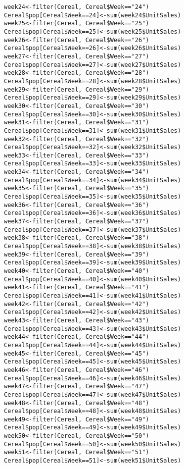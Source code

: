 \documentclass[12pt,english]{article}
\begin{document}
\begin{lstlisting}
week24<-filter(Cereal, Cereal$Week=="24")
Cereal$pop[Cereal$Week==24]<-sum(week24$UnitSales)
week25<-filter(Cereal, Cereal$Week=="25")
Cereal$pop[Cereal$Week==25]<-sum(week25$UnitSales)
week26<-filter(Cereal, Cereal$Week=="26")
Cereal$pop[Cereal$Week==26]<-sum(week26$UnitSales)
week27<-filter(Cereal, Cereal$Week=="27")
Cereal$pop[Cereal$Week==27]<-sum(week27$UnitSales)
week28<-filter(Cereal, Cereal$Week=="28")
Cereal$pop[Cereal$Week==28]<-sum(week28$UnitSales)
week29<-filter(Cereal, Cereal$Week=="29")
Cereal$pop[Cereal$Week==29]<-sum(week29$UnitSales)
week30<-filter(Cereal, Cereal$Week=="30")
Cereal$pop[Cereal$Week==30]<-sum(week30$UnitSales)
week31<-filter(Cereal, Cereal$Week=="31")
Cereal$pop[Cereal$Week==31]<-sum(week31$UnitSales)
week32<-filter(Cereal, Cereal$Week=="32")
Cereal$pop[Cereal$Week==32]<-sum(week32$UnitSales)
week33<-filter(Cereal, Cereal$Week=="33")
Cereal$pop[Cereal$Week==33]<-sum(week33$UnitSales)
week34<-filter(Cereal, Cereal$Week=="34")
Cereal$pop[Cereal$Week==34]<-sum(week34$UnitSales)
week35<-filter(Cereal, Cereal$Week=="35")
Cereal$pop[Cereal$Week==35]<-sum(week35$UnitSales)
week36<-filter(Cereal, Cereal$Week=="36")
Cereal$pop[Cereal$Week==36]<-sum(week36$UnitSales)
week37<-filter(Cereal, Cereal$Week=="37")
Cereal$pop[Cereal$Week==37]<-sum(week37$UnitSales)
week38<-filter(Cereal, Cereal$Week=="38")
Cereal$pop[Cereal$Week==38]<-sum(week38$UnitSales)
week39<-filter(Cereal, Cereal$Week=="39")
Cereal$pop[Cereal$Week==39]<-sum(week39$UnitSales)
week40<-filter(Cereal, Cereal$Week=="40")
Cereal$pop[Cereal$Week==40]<-sum(week40$UnitSales)
week41<-filter(Cereal, Cereal$Week=="41")
Cereal$pop[Cereal$Week==41]<-sum(week41$UnitSales)
week42<-filter(Cereal, Cereal$Week=="42")
Cereal$pop[Cereal$Week==42]<-sum(week42$UnitSales)
week43<-filter(Cereal, Cereal$Week=="43")
Cereal$pop[Cereal$Week==43]<-sum(week43$UnitSales)
week44<-filter(Cereal, Cereal$Week=="44")
Cereal$pop[Cereal$Week==44]<-sum(week44$UnitSales)
week45<-filter(Cereal, Cereal$Week=="45")
Cereal$pop[Cereal$Week==45]<-sum(week45$UnitSales)
week46<-filter(Cereal, Cereal$Week=="46")
Cereal$pop[Cereal$Week==46]<-sum(week46$UnitSales)
week47<-filter(Cereal, Cereal$Week=="47")
Cereal$pop[Cereal$Week==47]<-sum(week47$UnitSales)
week48<-filter(Cereal, Cereal$Week=="48")
Cereal$pop[Cereal$Week==48]<-sum(week48$UnitSales)
week49<-filter(Cereal, Cereal$Week=="49")
Cereal$pop[Cereal$Week==49]<-sum(week49$UnitSales)
week50<-filter(Cereal, Cereal$Week=="50")
Cereal$pop[Cereal$Week==50]<-sum(week50$UnitSales)
week51<-filter(Cereal, Cereal$Week=="51")
Cereal$pop[Cereal$Week==51]<-sum(week51$UnitSales)

\end{lstlisting}
\end{document}
